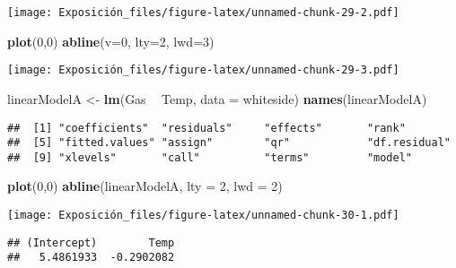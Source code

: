\documentclass[]{article}
\newenvironment{Shaded}{\begin{snugshade}}{\end{snugshade}}
\newcommand{\DataTypeTok}[1]{\textcolor[rgb]{0.13,0.29,0.53}{#1}}
\newcommand{\DecValTok}[1]{\textcolor[rgb]{0.00,0.00,0.81}{#1}}
\newcommand{\KeywordTok}[1]{\textcolor[rgb]{0.13,0.29,0.53}{\textbf{#1}}}
\newcommand{\NormalTok}[1]{#1}
\newcommand{\OperatorTok}[1]{\textcolor[rgb]{0.81,0.36,0.00}{\textbf{#1}}}
\newcommand{\StringTok}[1]{\textcolor[rgb]{0.31,0.60,0.02}{#1}}
\begin{document}
\texttt{[image: Exposición\_files/figure-latex/unnamed-chunk-29-2.pdf]}

\begin{Shaded}
\begin{Highlighting}[]
\KeywordTok{plot}\NormalTok{(}\DecValTok{0}\NormalTok{,}\DecValTok{0}\NormalTok{)}
\KeywordTok{abline}\NormalTok{(}\DataTypeTok{v=}\DecValTok{0}\NormalTok{, }\DataTypeTok{lty=}\DecValTok{2}\NormalTok{, }\DataTypeTok{lwd=}\DecValTok{3}\NormalTok{)}
\end{Highlighting}
\end{Shaded}

\texttt{[image: Exposición\_files/figure-latex/unnamed-chunk-29-3.pdf]}

\begin{Shaded}
\begin{Highlighting}[]
\NormalTok{linearModelA <-}\StringTok{ }\KeywordTok{lm}\NormalTok{(Gas }\OperatorTok{~}\StringTok{ }\NormalTok{Temp, }\DataTypeTok{data =}\NormalTok{ whiteside)}
\KeywordTok{names}\NormalTok{(linearModelA)}
\end{Highlighting}
\end{Shaded}

\begin{verbatim}
##  [1] "coefficients"  "residuals"     "effects"       "rank"         
##  [5] "fitted.values" "assign"        "qr"            "df.residual"  
##  [9] "xlevels"       "call"          "terms"         "model"
\end{verbatim}

\begin{Shaded}
\begin{Highlighting}[]
\KeywordTok{plot}\NormalTok{(}\DecValTok{0}\NormalTok{,}\DecValTok{0}\NormalTok{)}
\KeywordTok{abline}\NormalTok{(linearModelA, }\DataTypeTok{lty =} \DecValTok{2}\NormalTok{, }\DataTypeTok{lwd =} \DecValTok{2}\NormalTok{)}
\end{Highlighting}
\end{Shaded}

\texttt{[image: Exposición\_files/figure-latex/unnamed-chunk-30-1.pdf]}

\begin{Shaded}
\end{Shaded}

\begin{verbatim}
## (Intercept)        Temp 
##   5.4861933  -0.2902082
\end{verbatim}
\end{document}

